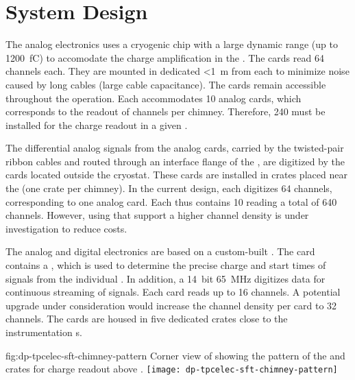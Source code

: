 \section{System Design}
\label{sec:dp-tpcelec-design}

The   analog electronics uses a cryogenic  chip with a large dynamic range (up to \SI{1200}{\femto\coulomb}) to accomodate the charge amplification in the . The  cards read \num{64}  channels each. They are mounted in dedicated   \SI{<1}{\metre} from each  to minimize noise caused by long cables (large cable capacitance). The cards remain accessible throughout the  operation. Each  accommodates \num{10}  analog cards, which corresponds to the readout of %
\dpchperchimney {} channels per chimney. Therefore, \num{240}  must be installed for the charge readout in a given .   

The differential analog signals from the analog  cards, carried by the twisted-pair ribbon cables and routed through an interface flange of the , are digitized by the  cards located outside the cryostat. These cards are installed in  crates placed near the  (one crate per chimney). In the current design, each  digitizes \num{64} channels, corresponding to one  analog card. Each  thus contains \num{10}  reading a total of \num{640} channels. However, using  that support a higher channel density is under investigation to reduce costs. 

The   analog and digital electronics are based on a custom-built . The card contains a   \cite{Blin:2017}, which is used to determine the precise charge and start times of signals from the %
individual . In addition, a \SI{14}{bit} \SI{65}{MHz}  digitizes data for continuous streaming of  signals. Each card reads up to \num{16} channels. %
A potential upgrade under consideration would increase the channel density per card to \num{32} channels. The  cards are housed in five dedicated  crates close to the  instrumentation \fdth{}s.

\begin{dunefigure}{fig:dp-tpcelec-sft-chimney-pattern}
{Corner view of  showing the pattern of the  and  crates for charge readout above .}
\texttt{[image: dp-tpcelec-sft-chimney-pattern]}
\end{dunefigure}

